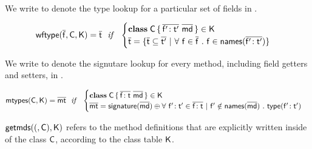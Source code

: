 \documentclass[a4paper,USenglish]{tex/lipics-v2016}
\begin{document}
\hrulefill


\begin{mathpar}



\end{mathpar}
\\


We write \wftype{\b\f}\C\K to denote the type lookup for a particular set of fields in \C.

\begin{equation*}
\wftype{\b\f}\C\K = \b\t ~~\mathit{if}~~ \begin{cases}

 \Class \C {\b{\Ftype\fp\tp}}{\b\md} \in \K\\
 \b\t = \{ \b\t \subseteq \b\tp ~|~ \forall~ \f \in \b\f ~.~ \f \in \names{\b{\Ftype\fp\tp}} \} \\
 
\end{cases}
\end{equation*}


We write \classoff\C\K to denote the signutare lookup for every method, including field getters and setters, in \C.

\begin{equation*}
\classoff\C\K = \b\mt ~~\mathit{if}~~ \begin{cases}

 \Class \C {\b{\Ftype\f\t}}{\b\md} \in \K\\
 \b\mt = \sign{\b\md} \oplus \forall ~\Ftype\fp\tp \in \b{\Ftype\f\t} ~|~ \fp \notin \names{\b\md} ~.~ \typez{\Ftype\fp\tp}

\end{cases}
\end{equation*}

$\getmds(\C,\K)$ refers to the method definitions that are explicitly written inside of the class $\C$, according to the class table $\K$.
\end{document}
